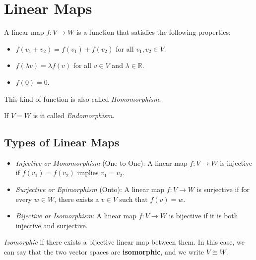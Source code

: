 \newpage
\section{Linear Maps}
A linear map \( f: V \to W \) is a function that satisfies the following properties:

\begin{itemize}[label=\(-\)]
    \item \( f(v_1 + v_2) = f(v_1) + f(v_2) \) for all \( v_1, v_2 \in V \).
    \item \( f(\lambda v) = \lambda f(v) \) for all \( v \in V \) and \( \lambda \in \mathbb{R} \).
    \item \( f(0) = 0 \).
\end{itemize} 

 This kind of function is also called \emph{Homomorphism}.

 If \(V = W\) is it called \emph{Endomorphism}.

\subsection{Types of Linear Maps}

\begin{itemize}[label=\(-\)]
    \item \emph{Injective or Monomorphism} (One-to-One): A linear map \( f: V \to W \) is injective if \( f(v_1) = f(v_2) \) implies \( v_1 = v_2 \).
    \item \emph{Surjective or Epimorphism} (Onto): A linear map \( f: V \to W \) is surjective if for every \( w \in W \), there exists a \( v \in V \) such that \( f(v) = w \).
    \item \emph{Bijective or Isomorphism}: A linear map \( f: V \to W \) is bijective if it is both injective and surjective.
\end{itemize}

\emph{Isomorphic} if there exists a bijective linear 
map between them. In this case, we can say that the two vector spaces are \textbf{isomorphic}, 
and we write \( V \cong W \).

